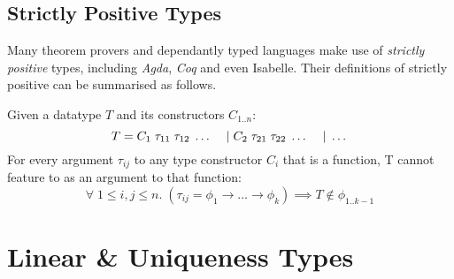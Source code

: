 \subsection{Strictly Positive Types}

Many theorem provers and dependantly typed languages make use of \textit{strictly positive} types, including 
\textit{Agda}\cite{AgdaStrictlyPositive}, \textit{Coq}\cite{CoqStrictlyPositive} and even
Isabelle\cite{IsabelleStrictlyPositive}. Their definitions of strictly positive can be summarised as follows.

Given a datatype $T$ and its constructors $C_{1..n}$:
$$
T = C_1\; \tau_{11} \; \tau_{12} \; \dots \\
\hspace{1.2em} \vert\; C_2\; \tau_{21} \; \tau_{22} \; \dots \\
\hspace{1.2em} \vert\; \dots
$$
For every argument $\tau_{ij}$ to any type constructor $C_i$ that is a function,
T cannot feature to as an argument to that function:
$$
\forall\; 1 \leq i,j \leq n.\;
 (\tau_{ij} = \phi_{1} \rightarrow \dots \rightarrow \phi_{k})
 \implies T \notin \phi_{1..k-1}
$$


\section{Linear \& Uniqueness Types}
